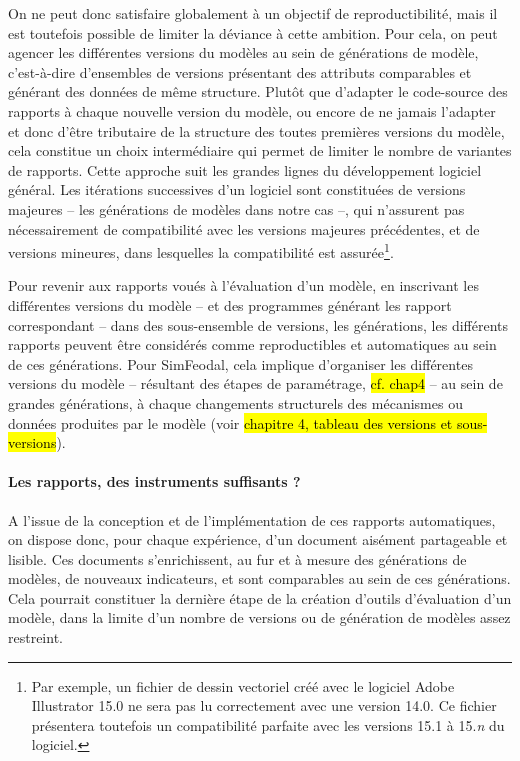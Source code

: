 On ne peut donc satisfaire globalement à un objectif de reproductibilité, mais il est toutefois possible de limiter la déviance à cette ambition.
Pour cela, on peut agencer les différentes versions du modèles au sein de \og générations\fg{} de modèle, c'est-à-dire d'ensembles de versions présentant des attributs comparables et générant des données de même structure.
Plutôt que d'adapter le code-source des rapports à chaque nouvelle version du modèle, ou encore de ne jamais l'adapter et donc d'être tributaire de la structure des toutes premières versions du modèle, cela constitue un choix intermédiaire qui permet de limiter le nombre de variantes de rapports.
Cette approche suit les grandes lignes du développement logiciel général. Les itérations successives d'un logiciel sont constituées de versions \og majeures\fg{} -- les générations de modèles dans notre cas --, qui n'assurent pas nécessairement de compatibilité avec les versions majeures précédentes, et de versions \og mineures\fg{}, dans lesquelles la compatibilité est assurée\footnote{
	Par exemple, un fichier de dessin vectoriel créé avec le logiciel Adobe Illustrator 15.0 ne sera pas lu correctement avec une version 14.0.
	Ce fichier présentera toutefois un compatibilité parfaite avec les versions 15.1 à 15.\textit{n} du logiciel.
}.

Pour revenir aux rapports voués à l'évaluation d'un modèle, en inscrivant les différentes versions du modèle -- et des programmes générant les rapport correspondant -- dans des sous-ensemble de versions, les \og générations\fg{}, les différents rapports peuvent être considérés comme reproductibles et automatiques au sein de ces générations.
Pour SimFeodal, cela implique d'organiser les différentes versions du modèle -- résultant des étapes de paramétrage, \hl{cf. chap4} -- au sein de grandes générations, à chaque changements structurels des mécanismes ou données produites par le modèle (voir \hl{chapitre 4, tableau des versions et sous-versions}).


\paragraph{Les rapports, des instruments suffisants ?}

A l'issue de la conception et de l'implémentation de ces rapports automatiques, on dispose donc, pour chaque expérience, d'un document aisément partageable et lisible.
Ces documents s'enrichissent, au fur et à mesure des générations de modèles, de nouveaux indicateurs, et sont comparables au sein de ces générations.
Cela pourrait constituer la dernière étape de la création d'outils d'évaluation d'un modèle, dans la limite d'un nombre de versions ou de génération de modèles assez restreint.

